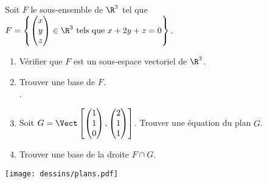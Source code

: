 \documentclass[12pt]{article}
\begin{document}
\begin{exercice}
  Soit $F$ le sous-ensemble  de $\R^3$ tel que $F = 
  \left \{
    \begin{pmatrix}
      x \\ y \\ z \\ 
    \end{pmatrix}
    \in \R^3
    \text{ tels que }
    x + 2y + z = 0 
  \right \}
  $.
  \begin{enumerate}
    \item Vérifier que $F$ est un sous-espace vectoriel de $\R^3$. 
    \item Trouver une base de $F$.
      \\\phantom{a}\hfill{}. 
    \item Soit $G = \Vect \left [ 
      \begin{pmatrix}
        1 \\ 1 \\ 0  \\ 
      \end{pmatrix}
      ,
      \begin{pmatrix}
        2 \\ 1 \\ 1  \\ 
      \end{pmatrix}
      \right ]
      $. 
      Trouver une équation du plan $G$. 
    \item Trouver une base de la droite $F \cap G$. 
  \end{enumerate}
\end{exercice}

\begin{center}
  \texttt{[image: dessins/plans.pdf]}
\end{center}
\end{document}

